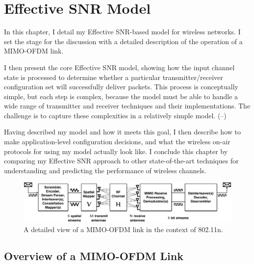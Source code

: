 \ifx\mainfile\undefined

\setcounter{chapter}{3} %
\fi

\cleardoublepage
\chapter{Effective SNR Model}
\label{chap:model}

In this chapter, I detail my Effective SNR-based model for wireless networks. I set the stage for the discussion with a detailed description of the operation of a MIMO-OFDM link.

I then present the core Effective SNR model, showing how the input channel state is processed to determine whether a particular transmitter/receiver configuration set will successfully deliver packets. %
This process is conceptually simple, but each step is complex, because the model must be able to handle a wide range of transmitter and receiver techniques and their implementations. The challenge is to capture these complexities in a relatively simple model. (--)

Having described my model and how it meets this goal, I then describe how to make application-level configuration decisions, and what the wireless on-air protocols for using my model actually look like. I conclude this chapter by comparing my Effective SNR approach to other state-of-the-art techniques for understanding and predicting the performance of wireless channels.

\begin{figure}[b]
\centering
\includegraphics[width=\textwidth]{figures/11n_link_simplified_bigger_fonts.pdf}
\caption[An 802.11n link]{\label{fig:11n_link_simplified}A detailed view of a MIMO-OFDM link in the context of 802.11n.}
\end{figure}

\section{Overview of a MIMO-OFDM Link}
\label{sec:11n_overview}

